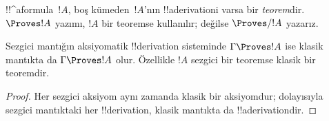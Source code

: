 \begin{defn}[Teoremler]
!!^a{formula}~$!A$, boş kümeden~$!A$'nın !!a{derivation}{}i varsa bir
\emph{teorem}dir. $\Proves !A$ yazımı, $!A$ bir teoremse kullanılır; değilse
$\Proves/ !A$ yazarız.
\end{defn}

\begin{prop}
  Sezgici mantığın aksiyomatik !!{derivation} sisteminde $\Gamma \Proves !A$
  ise klasik mantıkta da $\Gamma \Proves !A$ olur. Özellikle $!A$ sezgici bir
  teoremse klasik bir teoremdir.
\end{prop}

\begin{proof}
  Her sezgici aksiyom aynı zamanda klasik bir aksiyomdur; dolayısıyla sezgici
  mantıktaki her !!{derivation}, klasik mantıkta da !!a{derivation}{}dir.
\end{proof}

